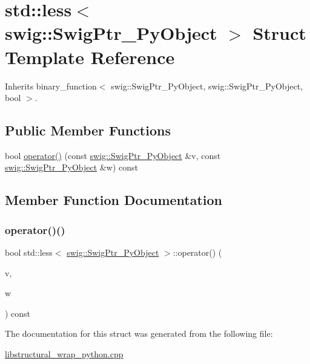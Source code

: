 \hypertarget{structstd_1_1less_3_01swig_1_1_swig_ptr___py_object_01_4}{}\section{std\+:\+:less$<$ swig\+:\+:Swig\+Ptr\+\_\+\+Py\+Object $>$ Struct Template Reference}
\label{structstd_1_1less_3_01swig_1_1_swig_ptr___py_object_01_4}


Inherits binary\+\_\+function$<$ swig\+::\+Swig\+Ptr\+\_\+\+Py\+Object, swig\+::\+Swig\+Ptr\+\_\+\+Py\+Object, bool $>$.

\subsection*{Public Member Functions}
\begin{DoxyCompactItemize}
\item 
bool \hyperlink{structstd_1_1less_3_01swig_1_1_swig_ptr___py_object_01_4_a4f69d736de91a5450e95bcee12b5b512}{operator()} (const \hyperlink{classswig_1_1_swig_ptr___py_object}{swig\+::\+Swig\+Ptr\+\_\+\+Py\+Object} \&v, const \hyperlink{classswig_1_1_swig_ptr___py_object}{swig\+::\+Swig\+Ptr\+\_\+\+Py\+Object} \&w) const
\end{DoxyCompactItemize}


\subsection{Member Function Documentation}
\mbox{\label{structstd_1_1less_3_01swig_1_1_swig_ptr___py_object_01_4_a4f69d736de91a5450e95bcee12b5b512}} 
\subsubsection{\texorpdfstring{operator()()}{operator()()}}
{\footnotesize\ttfamily bool std\+::less$<$ \hyperlink{classswig_1_1_swig_ptr___py_object}{swig\+::\+Swig\+Ptr\+\_\+\+Py\+Object} $>$\+::operator() (\begin{DoxyParamCaption}\item[{const \hyperlink{classswig_1_1_swig_ptr___py_object}{swig\+::\+Swig\+Ptr\+\_\+\+Py\+Object} \&}]{v,  }\item[{const \hyperlink{classswig_1_1_swig_ptr___py_object}{swig\+::\+Swig\+Ptr\+\_\+\+Py\+Object} \&}]{w }\end{DoxyParamCaption}) const\hspace{0.3cm}{\ttfamily [inline]}}



The documentation for this struct was generated from the following file\+:\begin{DoxyCompactItemize}
\item 
\hyperlink{libstructural__wrap__python_8cpp}{libstructural\+\_\+wrap\+\_\+python.\+cpp}\end{DoxyCompactItemize}
